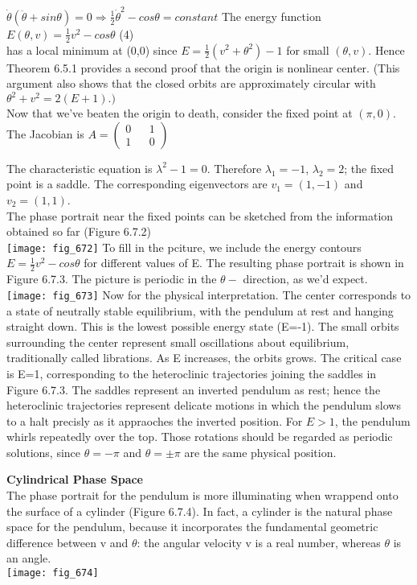 \documentclass{article}
\newcommand\tab[1][1cm]{\hspace*{#1}}
\begin{document}
$\dot{\theta}(\ddot{\theta} + sin \theta) = 0 \Rightarrow \frac{1}{2}\dot{\theta}^{2}-cos\theta =constant$
The energy function
\\ \tab \tab $E(\theta ,  v) = \frac{1}{2}v^{2}-cos\theta$ \tab (4) \\
has a local minimum at (0,0) since $E=\frac{1}{2}(v^{2}+\theta^{2})-1$ for small $(\theta , v).$ Hence Theorem 6.5.1 provides a second proof that the origin is nonlinear center. (This argument also shows that the closed orbits are approximately circular with $\theta^{2}+v^{2}=2(E+1).)$
 \\ \tab
Now that we've beaten the origin to death, consider the fixed point at $(\pi, 0)$. The Jacobian is 
$A = 
\begin{pmatrix}
0 && 1 \\ 
1 && 0
\end{pmatrix}
$

The characteristic equation is $\lambda^{2}-1=0$. Therefore $\lambda_{1}=-1$, $\lambda_{2}=2$; the fixed point is a saddle. The corresponding eigenvectors are $v_{1}=(1,-1)$ and $v_{2}=(1,1)$. 
\\ \tab The phase portrait near the fixed points can be sketched from the information obtained so far (Figure 6.7.2)
\\
\texttt{[image: fig\_672]}
To fill in the pciture, we include the energy contours $E={\frac{1}{2}}{v^{2}}-cos\theta$ for different values of E. The resulting phase portrait is shown in Figure 6.7.3. The picture is periodic in the $\theta -$ direction, as we'd expect. \\
\texttt{[image: fig\_673]}
 \tab Now for the physical interpretation. The center corresponds to a state of neutrally stable equilibrium, with the pendulum at rest and hanging straight down. This is the lowest possible energy state (E=-1). The small orbits surrounding the center represent small oscillations about equilibrium, traditionally called librations. As E increases, the orbits grows. The critical case is E=1, corresponding to the heteroclinic trajectories joining the saddles in Figure 6.7.3. The saddles represent an inverted pendulum as rest; hence the heteroclinic trajectories represent delicate motions in which the pendulum slows to a halt precisly as it appraoches the inverted position. For $E>1$, the pendulum whirls repeatedly over the top. Those rotations should be regarded as periodic solutions, since $\theta =-\pi$ and $\theta = \pm \pi$ are the same physical position. 

\textbf {Cylindrical Phase Space} \\ \tab
The phase portrait for the pendulum is more illuminating when wrappend onto the surface of a cylinder (Figure 6.7.4). In fact, a cylinder is the natural phase space for the pendulum, because it incorporates the fundamental geometric difference between v and $\theta$: the angular velocity v is a real number, whereas $\theta$ is an angle. 
\\ \tab
\texttt{[image: fig\_674]}
\end{document}
